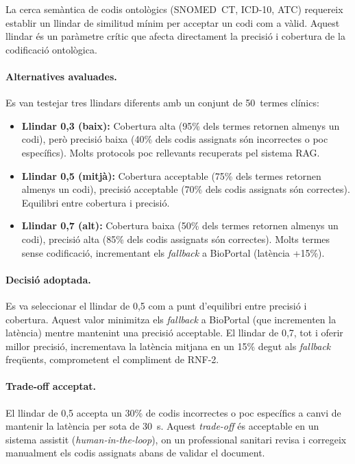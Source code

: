 \documentclass[CAT]{TFUOC}%
\begin{document}
La cerca semàntica de codis ontològics (SNOMED~CT, ICD-10, ATC) requereix establir un llindar de similitud mínim per acceptar un codi com a vàlid. Aquest llindar és un paràmetre crític que afecta directament la precisió i cobertura de la codificació ontològica.

\paragraph{Alternatives avaluades.}
Es van testejar tres llindars diferents amb un conjunt de 50~termes clínics:

\begin{itemize}
    \item \textbf{Llindar 0,3 (baix):} Cobertura alta (95\% dels termes retornen almenys un codi), però precisió baixa (40\% dels codis assignats són incorrectes o poc específics). Molts protocols poc rellevants recuperats pel sistema RAG.
    
    \item \textbf{Llindar 0,5 (mitjà):} Cobertura acceptable (75\% dels termes retornen almenys un codi), precisió acceptable (70\% dels codis assignats són correctes). Equilibri entre cobertura i precisió.
    
    \item \textbf{Llindar 0,7 (alt):} Cobertura baixa (50\% dels termes retornen almenys un codi), precisió alta (85\% dels codis assignats són correctes). Molts termes sense codificació, incrementant els \textit{fallback} a BioPortal (latència +15\%).
\end{itemize}

\paragraph{Decisió adoptada.}
Es va seleccionar el llindar de 0,5 com a punt d'equilibri entre precisió i cobertura. Aquest valor minimitza els \textit{fallback} a BioPortal (que incrementen la latència) mentre mantenint una precisió acceptable. El llindar de 0,7, tot i oferir millor precisió, incrementava la latència mitjana en un 15\% degut als \textit{fallback} freqüents, comprometent el compliment de RNF-2.

\paragraph{Trade-off acceptat.}
El llindar de 0,5 accepta un 30\% de codis incorrectes o poc específics a canvi de mantenir la latència per sota de 30~s. Aquest \textit{trade-off} és acceptable en un sistema assistit (\textit{human-in-the-loop}), on un professional sanitari revisa i corregeix manualment els codis assignats abans de validar el document.
\end{document}
